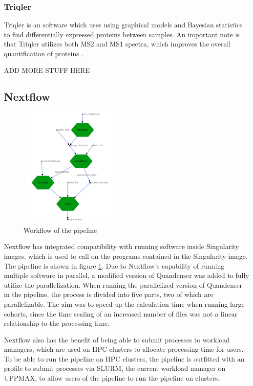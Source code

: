 \subsubsection{Triqler}
Triqler is an software which uses using graphical models and Bayesian statistics to find differentially expressed proteins between samples. An important note is that Triqler utilizes both MS2 and MS1 spectra, which improves the overall quantification of proteins \cite{triqler}.

ADD MORE STUFF HERE

\subsection{Nextflow}

\begin{figure}
  \centering
  \includegraphics[width=5cm, height=6cm]{pictures/workflow.png}
  \caption{Workflow of the pipeline}
  \label{fig:workflow}
\end{figure}

Nextflow has integrated compatibility with running software inside Singularity images, which is used to call on the programs contained in the Singularity image. The pipeline is shown in figure \ref{fig:workflow}. Due to Nextflow's capability of running multiple software in parallel, a modified version of Quandenser was added to fully utilize the parallelization. When running the parallelized version of Quandenser in the pipeline, the process is divided into five parts, two of which are parallelizable. The aim was to speed up the calculation time when running large cohorts, since the time scaling of an increased number of files was not a linear relationship to the processing time.

Nextflow also has the benefit of being able to submit processes to workload managers, which are used on HPC clusters to allocate processing time for users. To be able to run the pipeline on HPC clusters, the pipeline is outfitted with an profile to submit processes via SLURM, the current workload manager on UPPMAX, to allow users of the pipeline to run the pipeline on clusters.

